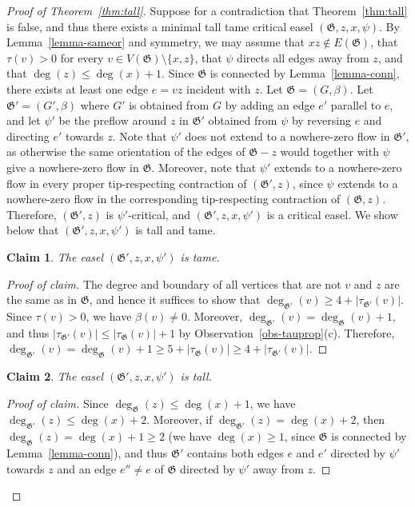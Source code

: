 \documentclass{article}
\newcommand\g{\mathfrak{G}}
\newtheorem*{claim*}{Claim}
\newenvironment{subproof}{%
  \renewcommand{\qedsymbol}{$\blacksquare$}%
  \begin{proof}[Proof of claim]%
}{%
  \end{proof}%
}
\begin{document}
\begin{proof}[Proof of Theorem~\ref{thm:tall}]
Suppose for a contradiction that Theorem~\ref{thm:tall} is false, and thus there exists a minimal tall tame critical easel $(\g,z,x,\psi)$.
By Lemma~\ref{lemma-sameor} and symmetry, we may assume that $xz\not\in E(\g)$, that $\tau(v)>0$ for every $v\in V(\g)\setminus\{x,z\}$, that $\psi$ directs all edges away from $z$, and that $\deg(z)\le \deg(x)+1$.  Since $\g$ is connected by Lemma~\ref{lemma-conn}, there exists at least one edge $e=vz$ incident with $z$.
Let $\g=(G,\beta)$. Let $\g'=(G',\beta)$ where $G'$ is obtained from $G$ by adding an edge $e'$ parallel to $e$, and let $\psi'$ be the preflow around $z$ in $\g'$ obtained from $\psi$ by reversing $e$ and directing $e'$ towards $z$.  Note that $\psi'$ does not extend to a nowhere-zero flow in $\g'$, as otherwise
the same orientation of the edges of $\g-z$ would together with $\psi$ give a nowhere-zero flow in $\g$.
Moreover, note that $\psi'$ extends to a nowhere-zero flow in every proper tip-respecting contraction of $(\g',z)$, since
$\psi$ extends to a nowhere-zero flow in the corresponding tip-respecting contraction of $(\g,z)$.
Therefore, $(\g',z)$ is $\psi'$-critical, and $(\g',z,x,\psi')$ is a critical easel. We show below that $(\g',z,x,\psi')$ is tall and tame.

\begin{claim*}
The easel $(\g',z,x,\psi')$ is tame.
\end{claim*}

\begin{subproof}
The degree and boundary of all vertices that are not $v$ and $z$ are the same as in $\g$, and hence it suffices to show that $\deg_{\g'}(v) \geq 4 + |\tau_{\g'}(v)|$. 
Since $\tau(v)>0$, we have $\beta(v)\neq 0$.
Moreover, $\deg_{\g'} (v)=\deg_{\g}(v)+1$, and thus $|\tau_{\g'}(v)|\le |\tau_{\g}(v)|+1$ by Observation~\ref{obs-tauprop}(c).  Therefore, $\deg_{\g'}(v)=\deg_{\g}(v)+1\ge 5+|\tau_{\g}(v)|\ge 4+|\tau_{\g'}(v)|$. 
\end{subproof}

\begin{claim*}
The easel $(\g',z,x,\psi')$ is tall.
\end{claim*}

\begin{subproof}
Since $\deg_{\g}(z)\le \deg(x)+1$, we have $\deg_{\g'}(z)\le \deg(x)+2$.
Moreover, if $\deg_{\g'}(z)=\deg(x)+2$, then $\deg_{\g}(z) = \deg(x)+1\ge 2$ (we have $\deg(x)\ge 1$, since $\g$ is connected by Lemma~\ref{lemma-conn}),
and thus $\g'$ contains both edges $e$ and $e'$ directed by $\psi'$ towards $z$
and an edge $e''\neq e$ of $\g$ directed by $\psi'$ away from $z$.
\end{subproof}




\end{proof}
\end{document}
